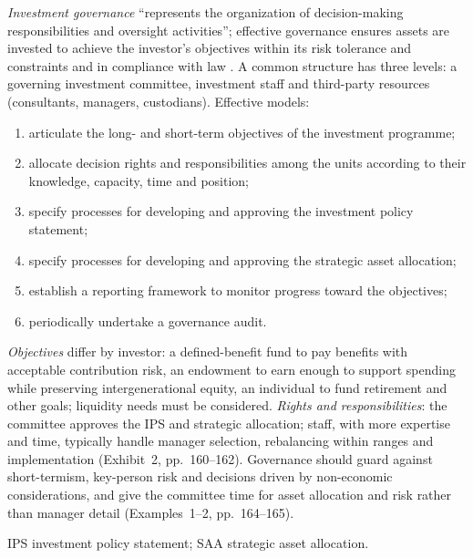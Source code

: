 \begin{qfdefinition}\label{def:investment-governance-allocation}
 \emph{Investment governance} ``represents the organization of decision-making responsibilities and oversight activities''; effective governance ensures assets are invested to achieve the investor's objectives within its risk tolerance and constraints and in compliance with law \citep[chap.~5, sec.~3, pp.~158--164]{portfolio-management-in-practice-v1-2020}. A common structure has three levels: a governing investment committee, investment staff and third-party resources (consultants, managers, custodians). Effective models:
\begin{enumerate}
\item articulate the long- and short-term objectives of the investment programme;
\item allocate decision rights and responsibilities among the units according to their knowledge, capacity, time and position;
\item specify processes for developing and approving the investment policy statement;
\item specify processes for developing and approving the strategic asset allocation;
\item establish a reporting framework to monitor progress toward the objectives;
\item periodically undertake a governance audit.
\end{enumerate}
\emph{Objectives} differ by investor: a defined-benefit fund to pay benefits with acceptable contribution risk, an endowment to earn enough to support spending while preserving intergenerational equity, an individual to fund retirement and other goals; liquidity needs must be considered. \emph{Rights and responsibilities}: the committee approves the IPS and strategic allocation; staff, with more expertise and time, typically handle manager selection, rebalancing within ranges and implementation (Exhibit~2, pp.~160--162). Governance should guard against short-termism, key-person risk and decisions driven by non-economic considerations, and give the committee time for asset allocation and risk rather than manager detail (Examples~1--2, pp.~164--165).

 IPS investment policy statement; SAA strategic asset allocation.


\end{qfdefinition}
